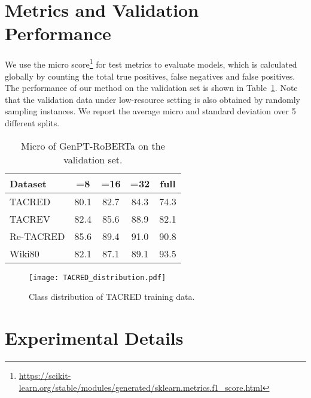 \documentclass[11pt]{article}
\begin{document}
\section{Metrics and Validation Performance}
We use the micro  score\footnote{\url{https://scikit-learn.org/stable/modules/generated/sklearn.metrics.f1_score.html}} for test metrics to evaluate models, which is calculated globally by counting the total true positives, false negatives and false positives. The performance of our method on the validation set is shown in Table~\ref{validation}. Note that the validation data under low-resource setting is also obtained by randomly sampling  instances. We report the average micro  and standard deviation over 5 different splits.
\begin{table}[h]
	\centering
\scalebox{0.7}
	{
		\begin{tabular}{lcccc}  
			\toprule
Dataset &=8&=16&=32&full\\\midrule
			TACRED&80.1 \small{}&82.7 \small{}&84.3 \small{}&74.3\\
			TACREV& 82.4 \small{} & 85.6 \small{} & 88.9 \small{} &82.1\\
			Re-TACRED& 85.6 \small{} &89.4 \small{}&91.0 \small{}&90.8\\
			Wiki80& 82.1 \small{} & 87.1 \small{} & 89.1 \small{} &93.5\\
			\bottomrule
		\end{tabular}
	}
	\caption{
		Micro  of GenPT-RoBERTa on the validation set.}
	\label{validation}
\end{table}
\begin{figure*}[t]
\centering
	\texttt{[image: TACRED\_distribution.pdf]}
	\caption{Class distribution of TACRED training data.}
	\label{class_distribution} 
\end{figure*}

\section{Experimental Details}\label{D}
\end{document}
